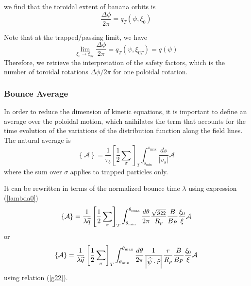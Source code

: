 we find that the toroidal extent of banana orbits is 
\begin{equation}
\frac{\Delta\phi}{2\pi}=q_{T}\left( \psi,\xi_{0}\right)
\end{equation}

Note that at the trapped/passing limit, we have 
\begin{equation}
\lim_{\xi_{0}\rightarrow\xi_{0T}}\frac{\Delta\phi}{2\pi}=q_{T}\left( \psi
,\xi_{0T}\right) =q\left( \psi\right)
\end{equation}
Therefore, we retrieve the interpretation of the safety factors, which is
the number of toroidal rotations $\Delta\phi/2\pi$ for one poloidal rotation.

\subsubsection{Bounce Average}

In order to reduce the dimension of kinetic equations, it is important to
define an average over the poloidal motion, which anihilates the term that
accounts for the time evolution of the variations of the distribution
function along the field lines. The natural average is 
\begin{equation}
\left\{ \mathcal{A}\right\} =\frac{1}{\tau _{b}}\left[ \frac{1}{2}%
\sum_{\sigma }\right] _{T}\int_{s_{\min }}^{s_{\max }}\frac{ds}{\left|
v_{s}\right| }\mathcal{A}  \label{bav0}
\end{equation}
where the sum over $\sigma $ applies to trapped particles only. %

It can be rewritten in terms of the normalized bounce time $\lambda $ using
expression (\ref{lambda0}) 
\begin{equation}
\left\{ \mathcal{A}\right\} =\frac{1}{\lambda \widetilde{q}}\left[ \frac{1}{2%
}\sum_{\sigma }\right] _{T}\int_{\theta _{\min }}^{\theta _{\max }}\frac{%
d\theta }{2\pi }\frac{\sqrt{g_{22}}}{R_{p}}\frac{B}{B_{P}}\frac{\xi _{0}}{%
\xi }\mathcal{A}  \label{bav}
\end{equation}
or 
\begin{equation}
\left\{ \mathcal{A}\right\} =\frac{1}{\lambda \widetilde{q}}\left[ \frac{1}{2%
}\sum_{\sigma }\right] _{T}\int_{\theta _{\min }}^{\theta _{\max }}\frac{%
d\theta }{2\pi }\frac{1}{\left| \widehat{\psi }\cdot \widehat{r}\right| }%
\frac{r}{R_{p}}\frac{B}{B_{P}}\frac{\xi _{0}}{\xi }\mathcal{A}  \label{bav2}
\end{equation}
using relation (\ref{g22}).

